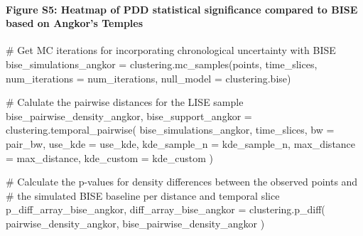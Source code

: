 \documentclass[
  11pt,
  letterpaper,
  DIV=11,
  numbers=noendperiod]{scrartcl}
\let\oldparagraph\paragraph
\renewcommand{\paragraph}[1]{\oldparagraph{#1}\mbox{}}
\newenvironment{Shaded}{\begin{snugshade}}{\end{snugshade}}
\newcommand{\CommentTok}[1]{\textcolor[rgb]{0.37,0.37,0.37}{#1}}
\newcommand{\NormalTok}[1]{\textcolor[rgb]{0.00,0.23,0.31}{#1}}
\newcommand{\OperatorTok}[1]{\textcolor[rgb]{0.37,0.37,0.37}{#1}}
\begin{document}
\paragraph{Figure S5: Heatmap of PDD statistical significance compared
to BISE based on Angkor's
Temples}\label{figure-s5-heatmap-of-pdd-statistical-significance-compared-to-bise-based-on-angkors-temples}

\begin{Shaded}
\begin{Highlighting}[]
\CommentTok{\# Get MC iterations for incorporating chronological uncertainty with BISE}
\NormalTok{bise\_simulations\_angkor }\OperatorTok{=}\NormalTok{ clustering.mc\_samples(points, }
\NormalTok{                                         time\_slices, }
\NormalTok{                                         num\_iterations }\OperatorTok{=}\NormalTok{ num\_iterations,}
\NormalTok{                                         null\_model }\OperatorTok{=}\NormalTok{ clustering.bise)}

\CommentTok{\# Calulate the pairwise distances for the LISE sample}
\NormalTok{bise\_pairwise\_density\_angkor, bise\_support\_angkor }\OperatorTok{=}\NormalTok{ clustering.temporal\_pairwise(}
\NormalTok{    bise\_simulations\_angkor, }
\NormalTok{    time\_slices, }
\NormalTok{    bw }\OperatorTok{=}\NormalTok{ pair\_bw, }
\NormalTok{    use\_kde }\OperatorTok{=}\NormalTok{ use\_kde,}
\NormalTok{    kde\_sample\_n }\OperatorTok{=}\NormalTok{ kde\_sample\_n, }
\NormalTok{    max\_distance }\OperatorTok{=}\NormalTok{ max\_distance,}
\NormalTok{    kde\_custom }\OperatorTok{=}\NormalTok{ kde\_custom}
\NormalTok{)}

\CommentTok{\# Calculate the p{-}values for density differences between the observed points and }
\CommentTok{\# the simulated BISE baseline per distance and temporal slice}
\NormalTok{p\_diff\_array\_bise\_angkor, diff\_array\_bise\_angkor }\OperatorTok{=}\NormalTok{ clustering.p\_diff(}
\NormalTok{    pairwise\_density\_angkor, }
\NormalTok{    bise\_pairwise\_density\_angkor}
\NormalTok{)}
\end{Highlighting}
\end{Shaded}
\end{document}
